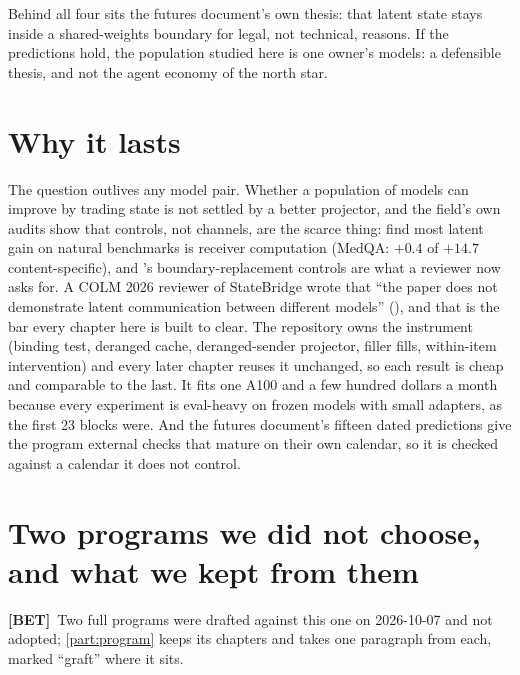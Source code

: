 \documentclass[11pt,a4paper]{report}
\newcommand{\BET}{\textcolor{betc}{\textbf{\scriptsize[BET]}}}
\begin{document}
Behind all four sits the futures document's own thesis: that latent state stays inside a shared-weights boundary for legal, not technical, reasons. If the predictions hold, the population studied here is one owner's models: a defensible thesis, and not the agent economy of the north star.

\section{Why it lasts}

The question outlives any model pair. Whether a population of models can improve by trading state is not settled by a better projector, and the field's own audits show that controls, not channels, are the scarce thing: \citet{2608.04893} find most latent gain on natural benchmarks is receiver computation (MedQA: $+0.4$ of $+14.7$ content-specific), and \citet{2607.26773}'s boundary-replacement controls are what a reviewer now asks for. A COLM 2026 reviewer of StateBridge wrote that ``the paper does not demonstrate latent communication between different models'' (), and that is the bar every chapter here is built to clear. The repository owns the instrument (binding test, deranged cache, deranged-sender projector, filler fills, within-item intervention) and every later chapter reuses it unchanged, so each result is cheap and comparable to the last. It fits one A100 and a few hundred dollars a month because every experiment is eval-heavy on frozen models with small adapters, as the first 23 blocks were. And the futures document's fifteen dated predictions give the program external checks that mature on their own calendar, so it is checked against a calendar it does not control.

\section{Two programs we did not choose, and what we kept from them}
\label{sec:notchosen}

\BET\ Two full programs were drafted against this one on 2026-10-07 and not adopted; \cref{part:program} keeps its chapters and takes one paragraph from each, marked ``graft'' where it sits.
\end{document}
